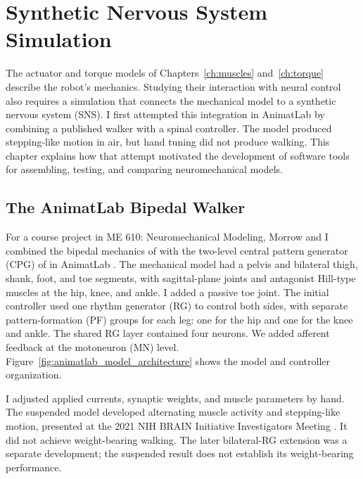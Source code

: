 \chapter{Synthetic Nervous System Simulation}\label{ch:sns}
\graphicspath{{figs/60-sns/}{figs/60-sns/AnimatLab_reference/}}

The actuator and torque models of Chapters~\ref{ch:muscles} and~\ref{ch:torque} describe the robot's mechanics. Studying their interaction with neural control also requires a simulation that connects the mechanical model to a synthetic nervous system (SNS). I first attempted this integration in AnimatLab by combining a published walker with a spinal controller. The model produced stepping-like motion in air, but hand tuning did not produce walking. This chapter explains how that attempt motivated the development of software tools for assembling, testing, and comparing neuromechanical models.

\section{The AnimatLab Bipedal Walker}\label{sec:prior_walker}

For a course project in ME 610: Neuromechanical Modeling, Morrow and I combined the bipedal mechanics of \citet{li_bipedal_2017} with the two-level central pattern generator (CPG) of \citet{deng_neuromechanical_2019} in AnimatLab \citep{cofer_animatlab_2010}. The mechanical model had a pelvis and bilateral thigh, shank, foot, and toe segments, with sagittal-plane joints and antagonist Hill-type muscles at the hip, knee, and ankle. I added a passive toe joint. The initial controller used one rhythm generator (RG) to control both sides, with separate pattern-formation (PF) groups for each leg: one for the hip and one for the knee and ankle. The shared RG layer contained four neurons. We added afferent feedback at the motoneuron (MN) level. Figure~\ref{fig:animatlab_model_architecture} shows the model and controller organization.

I adjusted applied currents, synaptic weights, and muscle parameters by hand. The suspended model developed alternating muscle activity and stepping-like motion, presented at the 2021 NIH BRAIN Initiative Investigators Meeting \citep{bolenTorqueValuesArtificialKnee2021June15-17}. It did not achieve weight-bearing walking. The later bilateral-RG extension was a separate development; the suspended result does not establish its weight-bearing performance.

